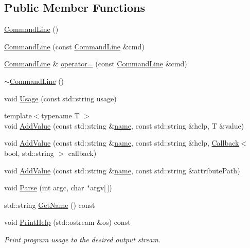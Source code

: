 \subsection*{Public Member Functions}
\begin{DoxyCompactItemize}
\item 
\hyperlink{classns3_1_1CommandLine_ae72c68fdc19bb9a8b20d7a3e17c9c7b0}{Command\+Line} ()
\item 
\hyperlink{classns3_1_1CommandLine_adfe4b2ca640421a354e013c41067211d}{Command\+Line} (const \hyperlink{classns3_1_1CommandLine}{Command\+Line} \&cmd)
\item 
\hyperlink{classns3_1_1CommandLine}{Command\+Line} \& \hyperlink{classns3_1_1CommandLine_aef891f537cdd07c04e493520d188deb1}{operator=} (const \hyperlink{classns3_1_1CommandLine}{Command\+Line} \&cmd)
\item 
\hyperlink{classns3_1_1CommandLine_a4bee5e5ab9cadebecc633d3b41a74650}{$\sim$\+Command\+Line} ()
\item 
void \hyperlink{classns3_1_1CommandLine_a9db9facadd99f6dfe78e39e22d5db3c0}{Usage} (const std\+::string usage)
\item 
{\footnotesize template$<$typename T $>$ }\\void \hyperlink{classns3_1_1CommandLine_addcfb546c7ad4c8bd0965654d55beb8e}{Add\+Value} (const std\+::string \&\hyperlink{generate__test__data__lte__spectrum__model_8m_ab74e6bf80237ddc4109968cedc58c151}{name}, const std\+::string \&help, T \&value)
\item 
void \hyperlink{classns3_1_1CommandLine_a20ff2bd99fd51ef5438345a862a8a092}{Add\+Value} (const std\+::string \&\hyperlink{generate__test__data__lte__spectrum__model_8m_ab74e6bf80237ddc4109968cedc58c151}{name}, const std\+::string \&help, \hyperlink{classns3_1_1Callback}{Callback}$<$ bool, std\+::string $>$ callback)
\item 
void \hyperlink{classns3_1_1CommandLine_ad66977ccb2c042574cb1831b8c1ad18f}{Add\+Value} (const std\+::string \&\hyperlink{generate__test__data__lte__spectrum__model_8m_ab74e6bf80237ddc4109968cedc58c151}{name}, const std\+::string \&attribute\+Path)
\item 
void \hyperlink{classns3_1_1CommandLine_a5c10b85b3207e5ecb48d907966923156}{Parse} (int argc, char $\ast$argv\mbox{[}$\,$\mbox{]})
\item 
std\+::string \hyperlink{classns3_1_1CommandLine_a114d7e6bddf575e40f7b62573a73c573}{Get\+Name} () const 
\item 
void \hyperlink{classns3_1_1CommandLine_a4558fd7b9eba52d77ffacb4e9896e5de}{Print\+Help} (std\+::ostream \&os) const 
\begin{DoxyCompactList}\small\item\em Print program usage to the desired output stream. \end{DoxyCompactList}\end{DoxyCompactItemize}
